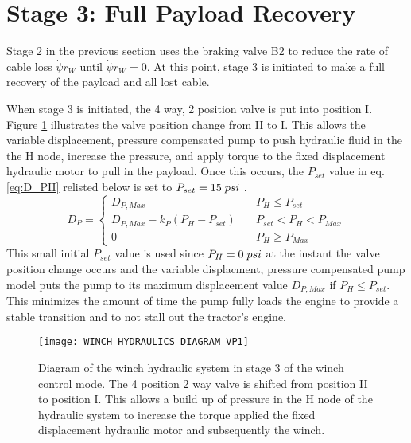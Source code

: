 \section{Stage 3: Full Payload Recovery}
Stage 2 in the previous section uses the braking valve B2 to reduce the rate of cable loss $\dot{\psi}r_W$ until $\dot{\psi}r_W = 0$. At this point, stage 3 is initiated to make a full recovery of the payload and all lost cable. 

When stage 3 is initiated, the 4 way, 2 position valve is put into position I. Figure \ref{fig:WINCH_HYDRAULICS_DIAGRAM_VP1} illustrates the valve position change from II to I. This allows the variable displacement, pressure compensated pump to push hydraulic fluid in the the H node, increase the pressure, and apply torque to the fixed displacement hydraulic motor to pull in the payload. Once this occurs, the $P_{set}$ value in eq. \ref{eq:D_PII} relisted below is set to $P_{set} = 15\hspace{1mm}psi$ \cite{MathWorks2015bb}.
\begin{equation*}
D_P = \left\{
        \begin{array}{ll}
            D_{P,Max} & \quad P_H \leq P_{set} \\
            D_{P,Max} - k_P(P_H - P_{set}) & \quad P_{set} < P_H < P_{Max} \\
            0 & \quad P_H \geq P_{Max}
        \end{array}
    \right.
\end{equation*}
This small initial $P_{set}$ value is used since $P_H = 0\hspace{1mm}psi$ at the instant the valve position change occurs and the variable displacment, pressure compensated pump model puts the pump to its maximum displacement value $D_{P,Max}$ if $P_H \leq P_{set}$. This minimizes the amount of time the pump fully loads the engine to provide a stable transition and to not stall out the tractor's engine.
\begin{figure}[ht]
    \centering
    \texttt{[image: WINCH\_HYDRAULICS\_DIAGRAM\_VP1]}
    \caption{Diagram of the winch hydraulic system in stage 3 of the winch control mode. The 4 position 2 way valve is shifted from position II to position I. This allows a build up of pressure in the H node of the hydraulic system to increase the torque applied the fixed displacement hydraulic motor and subsequently the winch.}
    \label{fig:WINCH_HYDRAULICS_DIAGRAM_VP1}
\end{figure}
